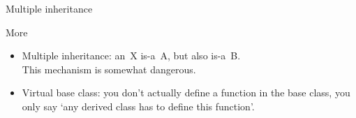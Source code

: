  {Multiple inheritance}

\begin{block}{More}
  \label{sl:obj-more}  
  \begin{itemize}
  \item  Multiple inheritance: an~X is-a~A, but also is-a~B.\\
    This mechanism is somewhat dangerous.
  \item Virtual base class: you don't actually define a function in
    the base class, you only say `any derived class has to define this
    function'.
  \end{itemize}
\end{block}

